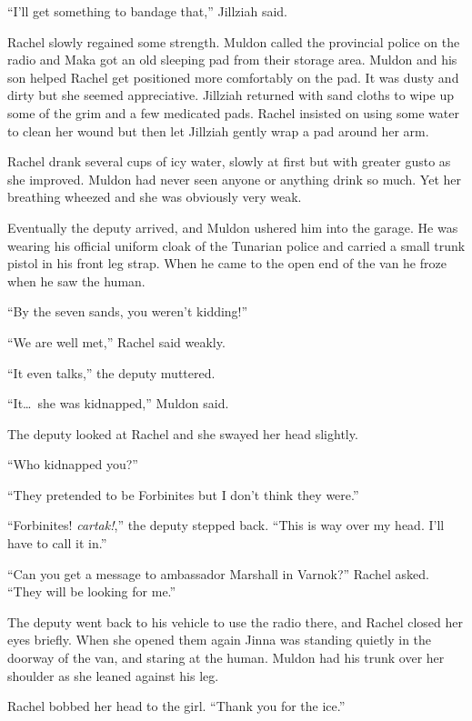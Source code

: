 ``I'll get something to bandage that,'' Jillziah said.

Rachel slowly regained some strength. Muldon called the provincial police on the radio and Maka
got an old sleeping pad from their storage area. Muldon and his son helped Rachel get positioned
more comfortably on the pad. It was dusty and dirty but she seemed appreciative. Jillziah
returned with sand cloths to wipe up some of the grim and a few medicated pads. Rachel insisted
on using some water to clean her wound but then let Jillziah gently wrap a pad around her arm.

Rachel drank several cups of icy water, slowly at first but with greater gusto as she improved.
Muldon had never seen anyone or anything drink so much. Yet her breathing wheezed and she was
obviously very weak. 

Eventually the deputy arrived, and Muldon ushered him into the garage. He was wearing his
official uniform cloak of the Tunarian police and carried a small trunk pistol in his front leg
strap. When he came to the open end of the van he froze when he saw the human.

``By the seven sands, you weren't kidding!''

``We are well met,'' Rachel said weakly.

``It even talks,'' the deputy muttered.

``It\ldots\ she was kidnapped,'' Muldon said.

The deputy looked at Rachel and she swayed her head slightly.

``Who kidnapped you?''

``They pretended to be Forbinites but I don't think they were.''

``Forbinites! \textit{cartak!},'' the deputy stepped back. ``This is way over my head. I'll have
to call it in.''

``Can you get a message to ambassador Marshall in Varnok?'' Rachel asked. ``They will be looking
for me.''


The deputy went back to his vehicle to use the radio there, and Rachel closed her eyes briefly.
When she opened them again Jinna was standing quietly in the doorway of the van, and staring at
the human. Muldon had his trunk over her shoulder as she leaned against his leg.

Rachel bobbed her head to the girl. ``Thank you for the ice.''

